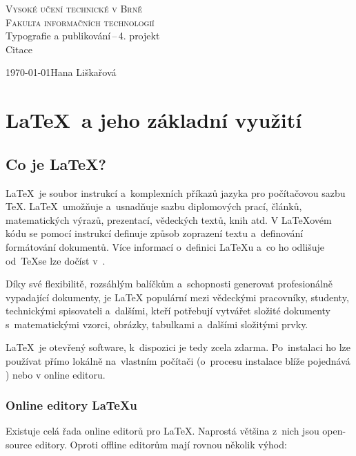\documentclass[a4paper, 11pt]{article}
\begin{document}
\begin{titlepage}
    \begin{center}
            \Huge{\textsc{Vysoké učení technické v Brně}}\\ %
            \huge{\textsc{Fakulta informačních technologií}}\\
        
        \LARGE{Typografie a publikování\,--\,4. projekt}\\
        \Huge{Citace}
    \end{center}
    {\Large{\today \hfill Hana Liškařová}}
\end{titlepage}

\section{\LaTeX\ a jeho základní využití}

\subsection{Co je \LaTeX ?}

\LaTeX\ je soubor instrukcí a~komplexních příkazů jazyka pro počítačovou sazbu \TeX. \LaTeX\ umožňuje a~usnadňuje sazbu diplomových prací, článků, matematických výrazů, prezentací, vědeckých textů, knih atd. V \LaTeX ovém kódu se pomocí instrukcí definuje způsob zoprazení textu a~definování formátování dokumentů. Více informací o~definici \LaTeX u a~co ho odlišuje od~\TeX se lze dočíst v~\cite{Kopka2004}.

Díky své flexibilitě, rozsáhlým balíčkům a~schopnosti generovat profesionálně vypadající dokumenty, je LaTeX populární mezi vědeckými pracovníky, studenty, technickými spisovateli a~dalšími, kteří potřebují vytvářet složité dokumenty s~matematickými vzorci, obrázky, tabulkami a~dalšími složitými prvky. 

\LaTeX\ je otevřený software, k~dispozici je tedy zcela zdarma. Po~instalaci ho lze používat přímo lokálně na~vlastním počítači (o~procesu instalace blíže pojednává \cite{It_network}) nebo v online editoru.

\subsubsection{Online editory \LaTeX u}
Existuje celá řada online editorů pro \LaTeX . Naprostá většina z~nich jsou open-source editory. Oproti offline editorům mají rovnou několik výhod: 
\end{document}
